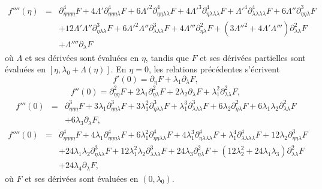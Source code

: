 \documentclass[12pt, final]{amsart}
\begin{document}
\begin{eqnarray}
  f'''' (\eta) & = & \partial_{\eta  \eta  \eta
  \eta}^4 F + 4 \Lambda' \partial_{\eta  \eta  \eta
  \lambda}^4 {F + 6 \Lambda'}^2 \partial_{\eta  \eta  \lambda
   \lambda}^4 {F + 4 \Lambda'}^3 \partial_{\eta  \lambda
   \lambda  \lambda}^4 {F + \Lambda'}^4 \partial_{\lambda
   \lambda  \lambda  \lambda}^4 F + 6 \Lambda''
  \partial_{\eta  \eta  \lambda}^3 F \nonumber\\
  &  & + 12 \Lambda' \Lambda'' \partial_{\eta  \lambda
  \lambda}^3 {F + 6 \Lambda'}^2 \Lambda'' \partial_{\lambda  \lambda
   \lambda}^3 F + 4 \Lambda''' \partial_{\eta  \lambda}^2 F +
  \left( {3 \Lambda''}^2 + 4 \Lambda' \Lambda''' \right) \partial_{\lambda
   \lambda}^2 F \\
  &  & + \Lambda'''' \partial_{\lambda} F
\end{eqnarray}
o{\`u} $\Lambda$ et ses dérivées sont évaluées en $\eta$,
tandis que $F$ et ses dérivées partielles sont évaluées en
$[\eta, \lambda_0 + \Lambda (\eta)]$. En $\eta = 0$, les relations
précédentes s'écrivent
\begin{equation}
  \label{eq20220107060454} f' (0) = \partial_{\eta} F + \lambda_1
  \partial_{\lambda} F,
\end{equation}
\begin{equation}
  \label{eq20220107124311} f'' (0) = \partial_{\eta  \eta}^2 F + 2
  \lambda_1 \partial_{\eta  \lambda}^2 F + 2 \lambda_2
  \partial_{\lambda} F + \lambda_1^2 \partial_{\lambda  \lambda}^2 F,
\end{equation}
\begin{eqnarray}
  f''' (0) & = & \partial_{\eta  \eta  \eta}^3 F + 3 \lambda_1
  \partial_{\eta  \eta  \lambda}^3 F + 3 \lambda_1^2
  \partial_{\eta  \lambda  \lambda}^3 F + \lambda_1^3
  \partial_{\lambda  \lambda  \lambda}^3 F + 6 \lambda_2
  \partial_{\eta  \lambda}^2 F + 6 \lambda_1 \lambda_2
  \partial_{\lambda  \lambda}^2 F \nonumber\\
  &  &  + 6 \lambda_3 \partial_{\lambda} F,
  \label{eq20220107060500}
\end{eqnarray}
\begin{eqnarray}
  f'''' (0) & = & \partial_{\eta  \eta  \eta  \eta}^4
  F + 4 \lambda_1 \partial_{\eta  \eta  \eta
  \lambda}^4 F + 6 \lambda_1^2 \partial_{\eta  \eta  \lambda
   \lambda}^4 F + 4 \lambda_1^3 \partial_{\eta  \lambda
   \lambda  \lambda}^4 F + \lambda_1^4 \partial_{\lambda
   \lambda  \lambda  \lambda}^4 F + 12 \lambda_2
  \partial_{\eta  \eta  \lambda}^3 F \nonumber\\
  &  & + 24 \lambda_1 \lambda_2 \partial_{\eta  \lambda
  \lambda}^3 F + 12 \lambda_1^2 \lambda_2 \partial_{\lambda  \lambda
   \lambda}^3 F + 24 \lambda_3 \partial_{\eta  \lambda}^2 F +
  (12 \lambda_2^2 + 24 \lambda_1 \lambda_3) \partial_{\lambda
  \lambda}^2 F \nonumber\\
  &  & + 24 \lambda_4 \partial_{\lambda} F,
\end{eqnarray}
o{\`u} $F$ et ses dérivées sont évaluées en $(0, \lambda_0)$.
\end{document}
